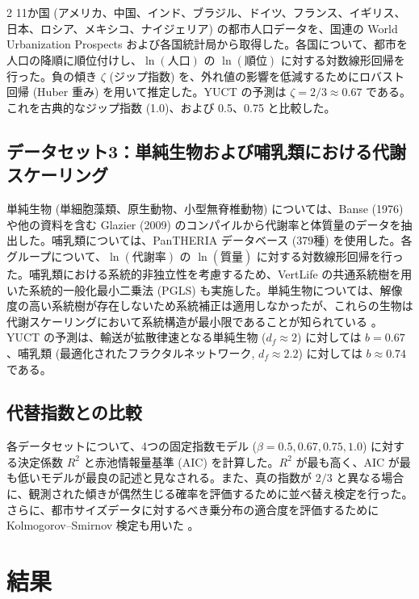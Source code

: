 \documentclass[11pt,a4paper]{article}
\newcommand{\df}{d_f}
\begin{document}
\begin{multicols}{2}
		11か国 (アメリカ、中国、インド、ブラジル、ドイツ、フランス、イギリス、日本、ロシア、メキシコ、ナイジェリア) の都市人口データを、国連の World Urbanization Prospects \cite{UN2018} および各国統計局から取得した。各国について、都市を人口の降順に順位付けし、\(\ln(\text{人口})\) の \(\ln(\text{順位})\) に対する対数線形回帰を行った。負の傾き \(\zeta\) (ジップ指数) を、外れ値の影響を低減するためにロバスト回帰 (Huber 重み) を用いて推定した。YUCT の予測は \(\zeta = 2/3 \approx 0.67\) である。これを古典的なジップ指数 (1.0)、および 0.5、0.75 と比較した。
		
		\subsection{データセット3：単純生物および哺乳類における代謝スケーリング}
		
		単純生物 (単細胞藻類、原生動物、小型無脊椎動物) については、Banse (1976) \cite{Banse1976} や他の資料を含む Glazier (2009) \cite{Glazier2009} のコンパイルから代謝率と体質量のデータを抽出した。哺乳類については、PanTHERIA データベース \cite{PanTHERIA} (379種) を使用した。各グループについて、\(\ln(\text{代謝率})\) の \(\ln(\text{質量})\) に対する対数線形回帰を行った。哺乳類における系統的非独立性を考慮するため、VertLife \cite{VertLife} の共通系統樹を用いた系統的一般化最小二乗法 (PGLS) も実施した。単純生物については、解像度の高い系統樹が存在しないため系統補正は適用しなかったが、これらの生物は代謝スケーリングにおいて系統構造が最小限であることが知られている \cite{Glazier2005}。YUCT の予測は、輸送が拡散律速となる単純生物 (\(\df \approx 2\)) に対しては \(b = 0.67\)、哺乳類 (最適化されたフラクタルネットワーク, \(\df \approx 2.2\)) に対しては \(b \approx 0.74\) である。
		
		\subsection{代替指数との比較}
		
		各データセットについて、4つの固定指数モデル (\(\beta = 0.5, 0.67, 0.75, 1.0\)) に対する決定係数 \(R^2\) と赤池情報量基準 (AIC) を計算した。\(R^2\) が最も高く、AIC が最も低いモデルが最良の記述と見なされる。また、真の指数が \(2/3\) と異なる場合に、観測された傾きが偶然生じる確率を評価するために並べ替え検定を行った。さらに、都市サイズデータに対するべき乗分布の適合度を評価するために Kolmogorov–Smirnov 検定も用いた \cite{Clauset2009}。
		
		\section{結果}
		

\end{multicols}
\end{document}
